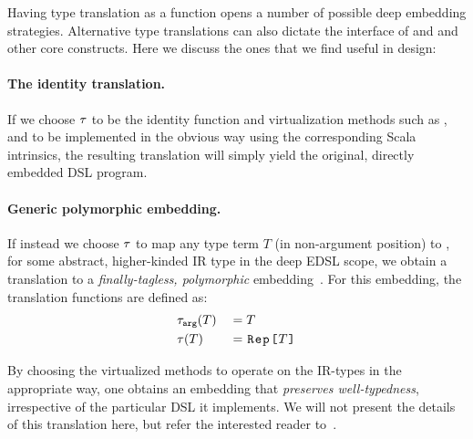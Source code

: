   Having type translation as a function opens a number of possible deep embedding
   strategies. Alternative type translations can also dictate the interface of 
   and  and other core \edsl{} constructs. Here we discuss the ones that we find
   useful in \edsl{} design:

\paragraph{The identity translation.}  If we choose $\ttother$ to be
the identity function and virtualization methods such as ,
 and  to be implemented in the obvious way
using the corresponding Scala intrinsics, the resulting translation
will simply yield the original, directly embedded DSL program.

\paragraph{Generic polymorphic embedding.} If instead we choose
$\ttother$ to map any type term $T$ (in non-argument position)
to , for some abstract, higher-kinded IR type
 in the deep EDSL scope, we obtain a translation to a
\emph{finally-tagless, polymorphic}
embedding~\cite{carette_finally_2009,hofer_polymorphic_2008}. For this
embedding, the translation functions are defined as:
\begin{alignat*}{2}
&\ttarg[T]   & \; = \; & T \\
&\ttother[T] & \; = \; & \text{\code{Rep[}} T \text{\code{]}}
\end{alignat*}

By choosing the virtualized methods to operate on the IR-types in the
appropriate way, one obtains an embedding that \emph{preserves
  well-typedness}, irrespective of the particular DSL it implements.
We will not present the details of this translation here, but refer
the interested reader to~\cite{carette_finally_2009}.

